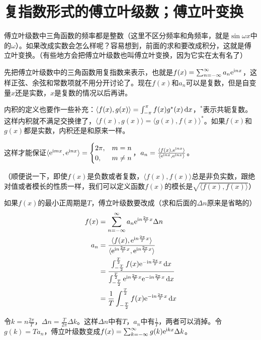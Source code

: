 \section{复指数形式的傅立叶级数；傅立叶变换}
傅立叶级数中三角函数的频率都是整数（这里不区分频率和角频率，就是$\sin \omega x$中的$\omega$）。如果改成实数会怎么样呢？容易想到，前面的求和要改成积分，这就是傅立叶变换。（有些地方会把傅立叶级数也叫傅立叶变换，因为它实在太有名了）

先把傅立叶级数中的三角函数用复指数来表示，也就是$f(x)=\sum_{n=-\infty}^{\infty} a_n \mathrm{e}^{\mathrm{i} n x}$，这样正弦、余弦和常数项就不用分开讨论了。现在$f(x)$和$a_n$可以是复数，但是自变量$x$还是实数，$x$是复数的情况以后再讲。

内积的定义也要作一些补充：$\langle f(x),g(x) \rangle=\int_{-\pi}^{\pi} f(x) g^*(x) \mathop{}\!\mathrm{d} x$，${}^*$表示共轭复数。这样内积就不满足交换律了，$\langle f(x),g(x) \rangle=\langle g(x),f(x) \rangle^*$。如果$f(x)$和$g(x)$都是实数，内积还是和原来一样。

这样才能保证$\langle \mathrm{e}^{\mathrm{i} m x},\mathrm{e}^{\mathrm{i} n x} \rangle=\begin{cases} 2 \pi, &m=n \\ 0, &m \neq n \end{cases}$，$a_n=\frac{ \langle f(x),\mathrm{e}^{\mathrm{i} n x} \rangle}{\langle \mathrm{e}^{\mathrm{i} n x},\mathrm{e}^{\mathrm{i} n x} \rangle}$。

（顺便说一下，即使$f(x)$是负数或者复数，$\langle f(x),f(x) \rangle$总是非负实数，跟绝对值或者模长的性质一样，我们可以定义函数$f(x)$的模长是$\sqrt{\langle f(x),f(x) \rangle}$）

如果$f(x)$的最小正周期是$T$，傅立叶级数要改成（求和后面的$\Delta n$原来是省略的）
\begin{align*}
f(x)&=\sum_{n=-\infty}^{\infty} a_n \mathrm{e}^{\mathrm{i} n \frac{2 \pi}{T} x} \Delta n \\
a_n&=\frac{\langle f(x),\mathrm{e}^{\mathrm{i} n \frac{2 \pi}{T} x} \rangle}{\langle \mathrm{e}^{\mathrm{i} n \frac{2 \pi}{T} x},\mathrm{e}^{\mathrm{i} n \frac{2 \pi}{T} x} \rangle} \\
&=\frac{\int_{-\frac{T}{2}}^{\frac{T}{2}} f(x) \mathrm{e}^{-\mathrm{i} n \frac{2 \pi}{T} x} \mathop{}\!\mathrm{d} x}{\int_{-\frac{T}{2}}^{\frac{T}{2}} \mathrm{e}^{\mathrm{i} n \frac{2 \pi}{T} x} \mathrm{e}^{-\mathrm{i} n \frac{2 \pi}{T} x} \mathop{}\!\mathrm{d} x} \\
&=\frac{1}{T} \int_{-\frac{T}{2}}^{\frac{T}{2}} f(x) \mathrm{e}^{-\mathrm{i} n \frac{2 \pi}{T} x} \mathop{}\!\mathrm{d} x
\end{align*}

令$k=n \frac{2 \pi}{T}$，$\Delta n=\frac{T}{2 \pi} \Delta k$。这样$\Delta n$中有$T$，$a_n$中有$\frac{1}{T}$，两者可以消掉。令$g(k)=T a_n$，傅立叶级数变成$f(x)=\sum_{k=-\infty}^{\infty} g(k) \mathrm{e}^{\mathrm{i} k x} \Delta k$。

